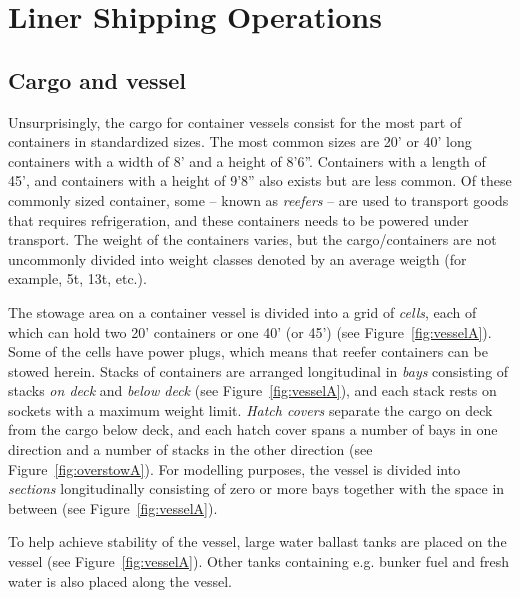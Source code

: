 \section{Liner Shipping Operations}\label{sec:stowage}
\subsection{Cargo and vessel}
Unsurprisingly, the cargo for container vessels consist for the most part of containers in standardized sizes. The most common sizes are 20' or 40' long containers with a width of 8' and a height of 8'6''. Containers with a length of 45', and containers with a height of 9'8'' also exists but are less common. Of these commonly sized container, some -- known as \emph{reefers} -- are used to transport goods that requires refrigeration, and these containers needs to be powered under transport.  The weight of the containers varies, but the cargo/containers are not uncommonly divided into weight classes denoted by an average weigth (for example, 5t, 13t, etc.).

The stowage area on a container vessel is divided into a grid of \emph{cells}, each of which can hold two 20' containers or one 40' (or 45') (see Figure~\ref{fig:vesselA}). Some of the cells have power plugs, which means that reefer containers can be stowed herein. 
Stacks of containers are arranged longitudinal in \emph{bays} consisting of stacks \emph{on deck} and \emph{below deck} (see Figure~\ref{fig:vesselA}), and each stack rests on sockets with a maximum weight limit. 
\emph{Hatch covers} separate the cargo on deck from the cargo below deck, and each hatch cover spans a number of bays in one direction and a number of stacks in the other direction (see Figure~\ref{fig:overstowA}).
For modelling purposes, the vessel is divided into \emph{sections} longitudinally consisting of zero or more bays together with the space in between (see Figure~\ref{fig:vesselA}). 

To help achieve stability of the vessel, large water ballast tanks are placed on the vessel (see Figure~\ref{fig:vesselA}). Other tanks containing e.g. bunker fuel and fresh water is also placed along the vessel.

